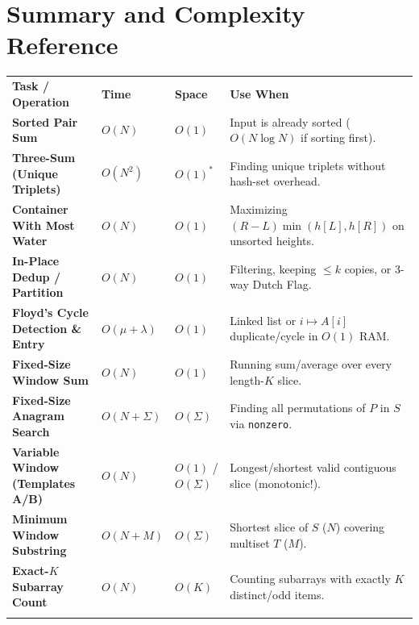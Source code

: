 \documentclass[11pt,a4paper]{article}
\theoremstyle{definition}
\begin{document}
\section{Summary and Complexity Reference}

\begingroup\small{}
\begin{tabularx}{\textwidth}{>{\raggedright\arraybackslash\bfseries}p{4.3cm} >{\centering\arraybackslash}p{2.0cm} >{\centering\arraybackslash}p{1.8cm} >{\raggedright\arraybackslash}X}
\arrayrulecolor{primaryblue}\toprule[1.2pt]
\rowcolor{primaryblue!10}
\textcolor{primaryblue}{\textbf{Task / Operation}} & \textcolor{primaryblue}{\textbf{Time}} & \textcolor{primaryblue}{\textbf{Space}} & \textcolor{primaryblue}{\textbf{Use When}} \\
\arrayrulecolor{codeframe}\midrule[0.6pt]
Sorted Pair Sum & $O(N)$ & $O(1)$ & Input is already sorted ($O(N \log N)$ if sorting first). \\
Three-Sum (Unique Triplets) & $O(N^2)$ & $O(1)^*$ & Finding unique triplets without hash-set overhead. \\
Container With Most Water & $O(N)$ & $O(1)$ & Maximizing $(R - L)\min(h[L], h[R])$ on unsorted heights. \\
In-Place Dedup / Partition & $O(N)$ & $O(1)$ & Filtering, keeping $\le k$ copies, or 3-way Dutch Flag. \\
Floyd's Cycle Detection \& Entry & $O(\mu + \lambda)$ & $O(1)$ & Linked list or $i \mapsto A[i]$ duplicate/cycle in $O(1)$ RAM. \\
Fixed-Size Window Sum & $O(N)$ & $O(1)$ & Running sum/average over every length-$K$ slice. \\
Fixed-Size Anagram Search & $O(N + \Sigma)$ & $O(\Sigma)$ & Finding all permutations of $P$ in $S$ via \texttt{nonzero}. \\
Variable Window (Templates A/B) & $O(N)$ & $O(1)$ / $O(\Sigma)$ & Longest/shortest valid contiguous slice (monotonic!). \\
Minimum Window Substring & $O(N + M)$ & $O(\Sigma)$ & Shortest slice of $S$ ($N$) covering multiset $T$ ($M$). \\
Exact-$K$ Subarray Count & $O(N)$ & $O(K)$ & Counting subarrays with exactly $K$ distinct/odd items. \\
\arrayrulecolor{primaryblue}\bottomrule[1.2pt]
\end{tabularx}\endgroup
\end{document}
